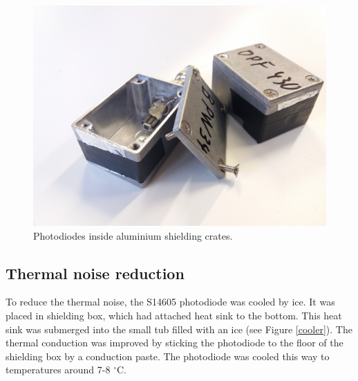 \begin{figure}[H]
 \centering
 \includegraphics[scale=0.09, angle = 0]{./pictures/ShieldCrate.jpg}
 \caption{Photodiodes inside aluminium shielding crates.}
 \label{crate}
 
\end{figure}


% 





\subsection{Thermal noise reduction}
To reduce the thermal noise, the S14605 photodiode was cooled by ice. It was placed in shielding box, which had attached heat sink to the bottom. This heat sink was submerged into the small tub filled with an ice (see Figure \ref{cooler}). The thermal conduction was improved by sticking the photodiode to the floor of the shielding box by a conduction paste. The photodiode was cooled this way to temperatures around 7-8 $^\circ$C.


